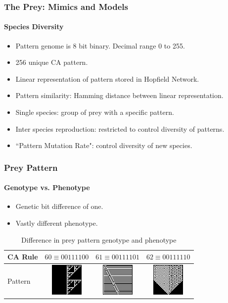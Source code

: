 \frame
{
	\frametitle{The Prey: Mimics and Models}
	\framesubtitle{Species Diversity}

	\begin{itemize}
		\item Pattern genome is 8 bit binary. Decimal range 0 to 255.
		\item 256 unique CA pattern.
		\item Linear representation of pattern stored in Hopfield Network.
		\item Pattern similarity: Hamming distance between linear representation.
		\item Single species: group of prey with a specific pattern.
		\item Inter species reproduction: restricted to control diversity of patterns.
		\item ``Pattern Mutation Rate": control diversity of new species.
	\end{itemize}
}

\frame
{
	\frametitle{Prey Pattern}
	\framesubtitle{Genotype vs. Phenotype}
	
	\begin{itemize}
		\item Genetic bit difference of one.
		\item Vastly different phenotype.
	\end{itemize}
	
	\begin{table}
	\centering
	\begin{scriptsize}
	\begin{tabular}{|l|c|c|c|}
	  \hline
	  CA Rule & \(60 \equiv 00111100\) & \(61 \equiv 00111101\) & \(62 \equiv 00111110 \) \\ \hline
	  Pattern & \parbox[c]{2.1em}{\includegraphics[scale=0.40]{../tex/images/CARule60}} 
	  				& \parbox[c]{2.1em}{\includegraphics[scale=0.40]{../tex/images/CARule61}} 
	  				& \parbox[c]{2.1em}{\includegraphics[scale=0.40]{../tex/images/CARule62}}\\
	  \hline
	\end{tabular}
	\end{scriptsize}
	\caption{Difference in prey pattern genotype and phenotype}
	\label{tab:diff-in-pattern}
	\end{table}
}


